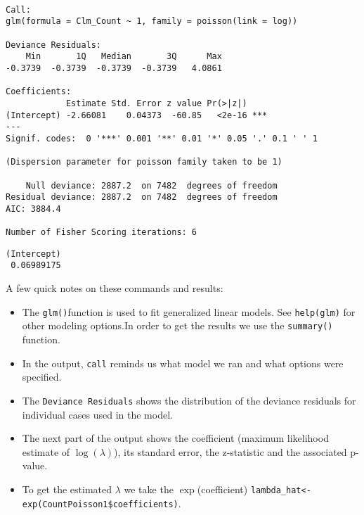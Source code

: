 \documentclass[]{book}
\newenvironment{Shaded}{\begin{snugshade}}{\end{snugshade}}
\newcommand{\KeywordTok}[1]{\textcolor[rgb]{0.13,0.29,0.53}{\textbf{#1}}}
\newcommand{\OperatorTok}[1]{\textcolor[rgb]{0.81,0.36,0.00}{\textbf{#1}}}
\newcommand{\NormalTok}[1]{#1}
\providecommand{\tightlist}{%
  \setlength{\itemsep}{0pt}\setlength{\parskip}{0pt}}
\theoremstyle{definition}
\theoremstyle{definition}
\theoremstyle{definition}
\theoremstyle{remark}
\begin{document}
\begin{verbatim}

Call:
glm(formula = Clm_Count ~ 1, family = poisson(link = log))

Deviance Residuals: 
    Min       1Q   Median       3Q      Max  
-0.3739  -0.3739  -0.3739  -0.3739   4.0861  

Coefficients:
            Estimate Std. Error z value Pr(>|z|)    
(Intercept) -2.66081    0.04373  -60.85   <2e-16 ***
---
Signif. codes:  0 '***' 0.001 '**' 0.01 '*' 0.05 '.' 0.1 ' ' 1

(Dispersion parameter for poisson family taken to be 1)

    Null deviance: 2887.2  on 7482  degrees of freedom
Residual deviance: 2887.2  on 7482  degrees of freedom
AIC: 3884.4

Number of Fisher Scoring iterations: 6
\end{verbatim}

\begin{Shaded}
\end{Shaded}

\begin{verbatim}
(Intercept) 
 0.06989175 
\end{verbatim}

A few quick notes on these commands and results:

\begin{itemize}
\tightlist
\item
  The \texttt{glm()}function is used to fit generalized linear models.
  See \texttt{help(glm)} for other modeling options.In order to get the
  results we use the \texttt{summary()} function.
\item
  In the output, \texttt{call} reminds us what model we ran and what
  options were specified.
\item
  The \texttt{Deviance\ Residuals} shows the distribution of the
  deviance residuals for individual cases used in the model.
\item
  The next part of the output shows the coefficient (maximum likelihood
  estimate of \(\log(\lambda)\)), its standard error, the z-statistic
  and the associated p-value.
\item
  To get the estimated \(\lambda\) we take the \(\exp\)(coefficient)
  \texttt{lambda\_hat\textless{}-exp(CountPoisson1\$coefficients)}.
\end{itemize}
\end{document}

